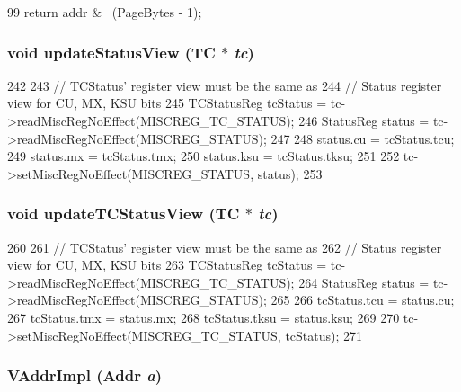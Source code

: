 \begin{DoxyCode}
99 { return addr & ~(PageBytes - 1); }
\end{DoxyCode}
\hypertarget{namespaceMipsISA_ad0ceebe8e2a7624b4522015586f786d5}{
\subsubsection[{updateStatusView}]{\setlength{\rightskip}{0pt plus 5cm}void updateStatusView (TC $\ast$ {\em tc})}}
\label{namespaceMipsISA_ad0ceebe8e2a7624b4522015586f786d5}



\begin{DoxyCode}
242 {
243     // TCStatus' register view must be the same as
244     // Status register view for CU, MX, KSU bits
245     TCStatusReg tcStatus = tc->readMiscRegNoEffect(MISCREG_TC_STATUS);
246     StatusReg status = tc->readMiscRegNoEffect(MISCREG_STATUS);
247 
248     status.cu = tcStatus.tcu;
249     status.mx = tcStatus.tmx;
250     status.ksu = tcStatus.tksu;
251 
252     tc->setMiscRegNoEffect(MISCREG_STATUS, status);
253 }
\end{DoxyCode}
\hypertarget{namespaceMipsISA_a14312b59ae8982e1caf5246e85b2c12b}{
\subsubsection[{updateTCStatusView}]{\setlength{\rightskip}{0pt plus 5cm}void updateTCStatusView (TC $\ast$ {\em tc})}}
\label{namespaceMipsISA_a14312b59ae8982e1caf5246e85b2c12b}



\begin{DoxyCode}
260 {
261     // TCStatus' register view must be the same as
262     // Status register view for CU, MX, KSU bits
263     TCStatusReg tcStatus = tc->readMiscRegNoEffect(MISCREG_TC_STATUS);
264     StatusReg status = tc->readMiscRegNoEffect(MISCREG_STATUS);
265 
266     tcStatus.tcu = status.cu;
267     tcStatus.tmx = status.mx;
268     tcStatus.tksu = status.ksu;
269 
270     tc->setMiscRegNoEffect(MISCREG_TC_STATUS, tcStatus);
271 }
\end{DoxyCode}
\hypertarget{namespaceMipsISA_ad4889586a6df5d65ddc6b5e084a79055}{
\subsubsection[{VAddrImpl}]{ VAddrImpl ({\bf Addr} {\em a})}}
\label{namespaceMipsISA_ad4889586a6df5d65ddc6b5e084a79055}




